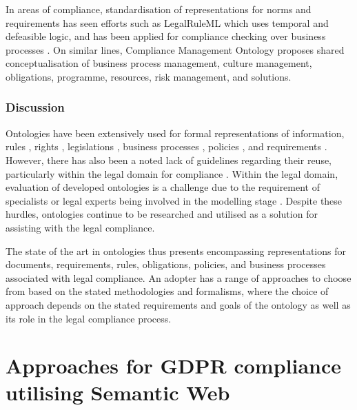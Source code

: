 In areas of compliance, standardisation of representations for norms and requirements has seen efforts such as LegalRuleML \cite{palmirani_legalruleml:_2011} which uses temporal and defeasible logic, and has been applied for compliance checking over business processes \cite{governatori_semantic_2016}. On similar lines, Compliance Management Ontology \cite{syed_abdullah_compliance_2012} proposes shared conceptualisation of business process management, culture management, obligations, programme, resources, risk management, and solutions.

\subsubsection{Discussion}
Ontologies have been extensively used for formal representations of information, rules \cite{kirrane_scalable_2018}, rights \cite{pellegrini_genealogy_2018}, legislations \cite{leone_taking_2019}, business processes \cite{elgammal_formalizing_2016}, policies \cite{van_de_ven_qualitative_2016}, and requirements \cite{gharib_ontologies_2016}.
However, there has also been a noted lack of guidelines regarding their reuse, particularly within the legal domain for compliance \cite{casanovas_legal_2017}.
Within the legal domain, evaluation of developed ontologies is a challenge due to the requirement of specialists or legal experts being involved in the modelling stage \cite{rodrigues_legal_2019}.
Despite these hurdles, ontologies continue to be researched and utilised as a solution for assisting with the legal compliance.

The state of the art in ontologies thus presents encompassing representations for documents, requirements, rules, obligations, policies, and business processes associated with legal compliance. An adopter has a range of approaches to choose from based on the stated methodologies and formalisms, where the choice of approach depends on the stated requirements and goals of the ontology as well as its role in the legal compliance process.

\section{Approaches for GDPR compliance utilising Semantic Web}\label{sec:sota:gdpr-semweb}


